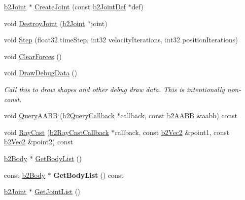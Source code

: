 \begin{DoxyCompactItemize}
\item 
\mbox{\hyperlink{classb2Joint}{b2\+Joint}} $\ast$ \mbox{\hyperlink{classb2World_a5cba9d0653149eb62504154e6fb35021}{Create\+Joint}} (const \mbox{\hyperlink{structb2JointDef}{b2\+Joint\+Def}} $\ast$def)
\item 
void \mbox{\hyperlink{classb2World_add5942aef171e54cfa384c8975746dca}{Destroy\+Joint}} (\mbox{\hyperlink{classb2Joint}{b2\+Joint}} $\ast$joint)
\item 
void \mbox{\hyperlink{classb2World_a7a8eff61af98461f978fe43f3af7be90}{Step}} (float32 time\+Step, int32 velocity\+Iterations, int32 position\+Iterations)
\item 
void \mbox{\hyperlink{classb2World_ac082ab4c4ad0b1c5ec4674315eeec643}{Clear\+Forces}} ()
\item 
\mbox{\label{classb2World_a293d9865e407fd463e168b0a29856acc}} 
void \mbox{\hyperlink{classb2World_a293d9865e407fd463e168b0a29856acc}{Draw\+Debug\+Data}} ()
\begin{DoxyCompactList}\small\item\em Call this to draw shapes and other debug draw data. This is intentionally non-\/const. \end{DoxyCompactList}\item 
void \mbox{\hyperlink{classb2World_ad169fae775be1e1f16386f7587786fa8}{Query\+A\+A\+BB}} (\mbox{\hyperlink{classb2QueryCallback}{b2\+Query\+Callback}} $\ast$callback, const \mbox{\hyperlink{structb2AABB}{b2\+A\+A\+BB}} \&aabb) const
\item 
void \mbox{\hyperlink{classb2World_aa9955d94a254253997daaf16ce77bab6}{Ray\+Cast}} (\mbox{\hyperlink{classb2RayCastCallback}{b2\+Ray\+Cast\+Callback}} $\ast$callback, const \mbox{\hyperlink{structb2Vec2}{b2\+Vec2}} \&point1, const \mbox{\hyperlink{structb2Vec2}{b2\+Vec2}} \&point2) const
\item 
\mbox{\hyperlink{classb2Body}{b2\+Body}} $\ast$ \mbox{\hyperlink{classb2World_a1b87c03955e3312d308ddf679adf3c85}{Get\+Body\+List}} ()
\item 
\mbox{\label{classb2World_a8afde497a719bb1507fdfb474e79881a}} 
const \mbox{\hyperlink{classb2Body}{b2\+Body}} $\ast$ {\bfseries Get\+Body\+List} () const
\item 
\mbox{\hyperlink{classb2Joint}{b2\+Joint}} $\ast$ \mbox{\hyperlink{classb2World_a55db7240f8290aa02cab79f181934de8}{Get\+Joint\+List}} ()
\item 
\mbox{\label{classb2World_af5f7feca7396ce10b905966a464177aa}} 

\end{DoxyCompactItemize}
